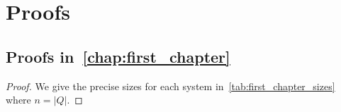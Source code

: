 \chapter{Proofs}
\label{app:proofs}




\section{Proofs in~\cref{chap:first_chapter}}


\begin{proof}
    We give the precise sizes for each system in~\cref{tab:first_chapter_sizes} where $n = |Q|$.
\end{proof}




